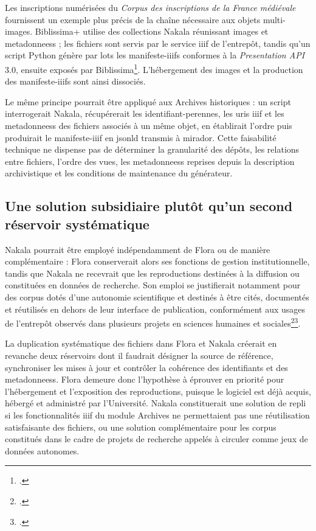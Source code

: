 Les inscriptions numérisées du \emph{Corpus des inscriptions de la France médiévale} fournissent un exemple plus précis de la chaîne nécessaire aux objets multi-images. Biblissima+ utilise des collections Nakala réunissant images et \glspl{metadonnees} ; les fichiers sont servis par le service \gls{iiif} de l'entrepôt, tandis qu'un script Python génère par lots les \glspl{manifeste-iiif} conformes à la \emph{Presentation API} 3.0, ensuite exposés par Biblissima\footcite{BiblissimaNakalaIIIF}. L'hébergement des images et la production des \glspl{manifeste-iiif} sont ainsi dissociés.

Le même principe pourrait être appliqué aux Archives historiques : un script interrogerait Nakala, récupérerait les \glspl{identifiant-perenne}, les \glspl{uri} \gls{iiif} et les \glspl{metadonnees} des fichiers associés à un même objet, en établirait l'ordre puis produirait le \gls{manifeste-iiif} en \gls{jsonld} transmis à \gls{mirador}. Cette faisabilité technique ne dispense pas de déterminer la granularité des dépôts, les relations entre fichiers, l'ordre des vues, les \glspl{metadonnees} reprises depuis la description archivistique et les conditions de maintenance du générateur.


\subsection{Une solution subsidiaire plutôt qu'un second réservoir systématique}

Nakala pourrait être employé indépendamment de Flora ou de manière complémentaire : Flora conserverait alors ses fonctions de gestion institutionnelle, tandis que Nakala ne recevrait que les reproductions destinées à la diffusion ou constituées en données de recherche. Son emploi se justifierait notamment pour des corpus dotés d'une autonomie scientifique et destinés à être cités, documentés et réutilisés en dehors de leur interface de publication, conformément aux usages de l'entrepôt observés dans plusieurs projets en sciences humaines et sociales\footcite{LeFournerPerretNakala}\footcite{Chadier2024Nakala}.

La duplication systématique des fichiers dans Flora et Nakala créerait en revanche deux réservoirs dont il faudrait désigner la source de référence, synchroniser les mises à jour et contrôler la cohérence des identifiants et des \glspl{metadonnees}. Flora demeure donc l'hypothèse à éprouver en priorité pour l'hébergement et l'exposition des reproductions, puisque le logiciel est déjà acquis, hébergé et administré par l'Université. Nakala constituerait une solution de repli si les fonctionnalités \gls{iiif} du module Archives ne permettaient pas une réutilisation satisfaisante des fichiers, ou une solution complémentaire pour les corpus constitués dans le cadre de projets de recherche appelés à circuler comme jeux de données autonomes.


